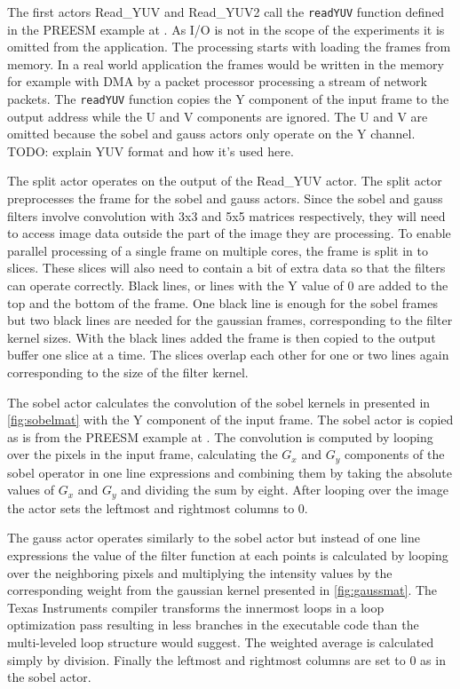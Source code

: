 The first actors Read\_YUV and Read\_YUV2 call the \texttt{readYUV} function
defined in the PREESM example at \cite{preesmtut}. As I/O is not in the scope of
the experiments it is omitted from the application. The processing starts with
loading the frames from memory. In a real world application the frames would be
written in the memory for example with DMA by a packet processor processing a
stream of network packets. The \texttt{readYUV} function copies the Y component
of the input frame to the output address while the U and V components are
ignored. The U and V are omitted because the sobel and gauss actors only operate
on the Y channel. TODO: explain YUV format and how it's used here.

The split actor operates on the output of the Read\_YUV actor. The split actor
preprocesses the frame for the sobel and gauss actors. Since the sobel and gauss
filters involve convolution with 3x3 and 5x5 matrices respectively, they will
need to access image data outside the part of the image they are processing. To
enable parallel processing of a single frame on multiple cores, the frame is
split in to slices. These slices will also need to contain a bit of extra data
so that the filters can operate correctly. Black lines, or lines with the Y
value of 0 are added to the top and the bottom of the frame. One black line is
enough for the sobel frames but two black lines are needed for the gaussian
frames, corresponding to the filter kernel sizes.  With the black lines added
the frame is then copied to the output buffer one slice at a time. The slices
overlap each other for one or two lines again corresponding to the size of the
filter kernel.

The sobel actor calculates the convolution of the sobel kernels in presented in
\ref{fig:sobelmat} with the Y component of the input frame. The sobel actor is
copied as is from the PREESM example at \cite{preesmtut}. The convolution is
computed by looping over the pixels in the input frame, calculating the $G_{x}$
and $G_{y}$ components of the sobel operator in one line expressions and
combining them by taking the absolute values of $G_{x}$ and $G_{y}$ and dividing
the sum by eight. After looping over the image the actor sets the leftmost and
rightmost columns to 0.

The gauss actor operates similarly to the sobel actor but instead of one line
expressions the value of the filter function at each points is calculated by
looping over the neighboring pixels and multiplying the intensity values by the
corresponding weight from the gaussian kernel presented in \ref{fig:gaussmat}.
The Texas Instruments compiler transforms the innermost loops in a loop
optimization pass resulting in less branches in the executable code than the
multi-leveled loop structure would suggest. The weighted average is calculated
simply by division. Finally the leftmost and rightmost columns are set to 0 as
in the sobel actor.

